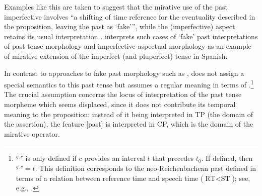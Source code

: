 \documentclass[output=paper,
colorlinks,
citecolor=brown,
newtxmath
]{langscibook}
\begin{document}
\noindent Examples like this are taken to suggest that the mirative use of the past imperfective involves ``a shifting of time reference for the eventuality described in the proposition, leaving the past as `fake'{''}, while the (imperfective) aspect retains its usual interpretation \citep[6]{Bustamante2013}. \citeauthor{Bustamante2013} interprets such cases of `fake' past interpretations of past tense morphology and imperfective aspectual morphology as an example of mirative extension of the imperfect (and pluperfect) tense in Spanish.
%
%

In contrast to approaches to fake past morphology such as \citet{Iatridou2000}, \citeauthor{Bustamante2013} does not assign a special semantics to this past tense but assumes a regular meaning in terms of \citet[10]{Kratzer1998}.\footnote{$^{g,c}$ is only defined if $c$ provides an interval $t$ that precedes $t_0$. If defined, then $^{g,c}=t$. This definition corresponds to the neo-Reichenbachean past defined in terms of a relation between reference time and speech time ($\text{RT}<\text{ST}$); see, e.g., \citet{Klein1994}.}
The crucial assumption concerns the locus of interpretation of the past tense morpheme which seems displaced, since it does not contribute its temporal meaning to the proposition:
instead of it being interpreted in TP (the domain of the assertion), the feature [past] is interpreted in CP, which is the domain of the mirative operator.
\end{document}

